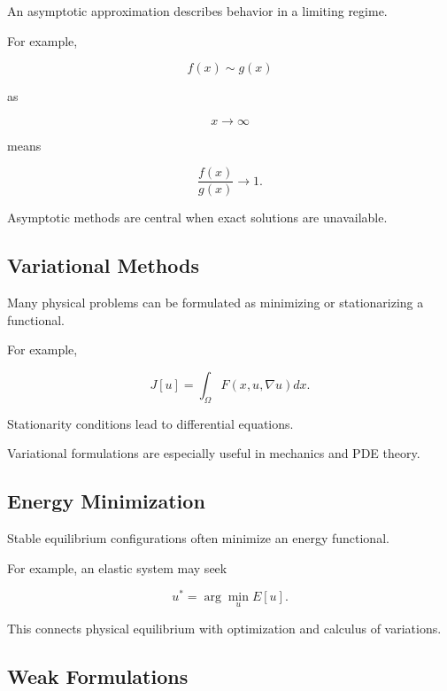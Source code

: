 An asymptotic approximation describes behavior in a limiting regime.

For example,

\[
f(x)
\sim
g(x)
\]

as

\[
x\to\infty
\]

means

\[
\boxed{
\frac{f(x)}{g(x)}
\to1.
}
\]

Asymptotic methods are central when exact solutions are unavailable.

\subsection{Variational Methods}
\label{subsec:variational-methods-physics}

Many physical problems can be formulated as minimizing or stationarizing a
functional.

For example,

\[
\boxed{
J[u]
=
\int_\Omega
F
\left(
x,u,\nabla u
\right)
dx.
}
\]

Stationarity conditions lead to differential equations.

Variational formulations are especially useful in mechanics and PDE theory.

\subsection{Energy Minimization}
\label{subsec:physical-energy-minimization}

Stable equilibrium configurations often minimize an energy functional.

For example, an elastic system may seek

\[
\boxed{
u^*
=
\arg\min_u
E[u].
}
\]

This connects physical equilibrium with optimization and calculus of
variations.

\subsection{Weak Formulations}
\label{subsec:weak-formulations-physics}

